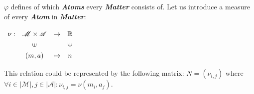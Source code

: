 \documentclass[a4paper]{article}
\begin{document}
$\varphi $ defines of which \textit{\textbf{Atoms}} every \textit{\textbf{Matter}} consists of. Let us introduce a measure of every \textit{\textbf{Atom}} in \textit{\textbf{Matter}}:

$\renewcommand{\arraystretch}{1.3}
\begin{array}[c]{ccccc}
{\nu}:&\mathscr{M} \times \mathscr{A} &\rightarrow&\mathbb{R}\\
&\rotatebox[origin=c]{90}{{$\in$}}&&\rotatebox{90}{$\in$}&\\
&(m, a)&\mapsto& n
\end{array}$

This relation could be represented by the following matrix:
$ {N}=\left(\nu_{{i,j}}\right) $ where $ \forall i \in |\mathscr{M}|, j \in |\mathscr{A}| : \nu_{{i,j}}=\nu \left( m_{{i}},a_{{j}} \right) $.
\end{document}
